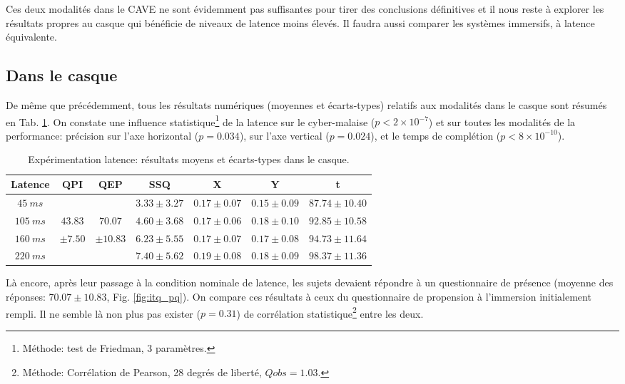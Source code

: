 	\par Ces deux modalités dans le CAVE ne sont évidemment pas suffisantes pour tirer des conclusions définitives et il nous reste à explorer les résultats propres au casque qui bénéficie de niveaux de latence moins élevés. Il faudra aussi comparer les systèmes immersifs, à latence équivalente.
	
	\subsection{Dans le casque}
	\par De même que précédemment, tous les résultats numériques (moyennes et écarts-types) relatifs aux modalités dans le casque sont résumés en Tab. \ref{tab:resultats_casque_latence}. On constate une influence statistique\footnote{Méthode: test de Friedman, 3 paramètres.} de la latence sur le cyber-malaise ($p < 2 \times 10^{-7}$) et sur toutes les modalités de la performance: précision sur l'axe horizontal ($p = 0.034$), sur l'axe vertical ($p = 0.024$), et le temps de complétion ($p < 8 \times 10^{-10}$).
	
	\begin{table}[h]	
		\centering
		\caption{Expérimentation latence: résultats moyens et écarts-types dans le casque.}
		\label{tab:resultats_casque_latence}
		\begin{tabular}{c|c|c|c|c|c|c}
			\textbf{Latence} & \textbf{QPI} & \textbf{QEP} & \textbf{SSQ} & \textbf{X} & \textbf{Y} & \textbf{t}\\ \hline			
			$45~ms$ & & & $3.33 \pm 3.27$ & $0.17 \pm 0.07$ & $0.15 \pm 0.09$ & $87.74 \pm 10.40$\\
			$105~ms$ & $43.83$ & $70.07$ & $4.60 \pm 3.68$ & $0.17 \pm 0.06$ & $0.18 \pm 0.10$ & $92.85 \pm 10.58$\\			
			$160~ms$ & $\pm 7.50$ & $\pm 10.83$ & $6.23 \pm 5.55$ & $0.17 \pm 0.07$ & $0.17 \pm 0.08$ & $94.73 \pm 11.64$\\
			$220~ms$ & & & $7.40 \pm 5.62$ & $0.19 \pm 0.08$ & $0.18 \pm 0.09$ & $98.37 \pm 11.36$\\
		\end{tabular}
	\end{table}
	
	\par Là encore, après leur passage à la condition nominale de latence, les sujets devaient répondre à un questionnaire de présence (moyenne des réponses: $70.07 \pm 10.83$, Fig. \ref{fig:itq_pq}). On compare ces résultats à ceux du questionnaire de propension à l'immersion initialement rempli. Il ne semble là non plus pas exister ($p = 0.31$) de corrélation statistique\footnote{Méthode: Corrélation de Pearson, 28 degrés de liberté, $Qobs = 1.03$.} entre les deux.
	
